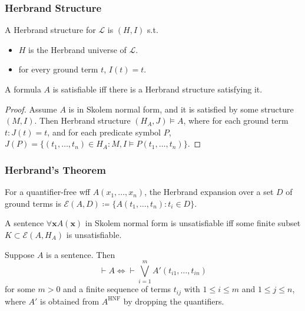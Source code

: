 \documentclass[UTF8,aspectratio=43,11pt,colorlinks,compress,openany]{beamer}%
\begin{document}
\begin{frame}\frametitle{Herbrand Structure}
\begin{definition}
A Herbrand structure for $\mathscr{L}$ is $(H,I)$ s.t.
\begin{itemize}
	\item $H$ is the Herbrand universe of $\mathscr{L}$.
	\item for every ground term $t$, $I(t)=t$.
\end{itemize}
\end{definition}
\begin{theorem}
A formula $A$ is satisfiable iff there is a Herbrand structure satisfying it.
\end{theorem}
\begin{proof}
Assume $A$ is in Skolem normal form, and it is satisfied by some structure $(M,I)$. Then Herbrand structure $(H_A,J)\vDash A$, where for each ground term $t: J(t)=t$, and for each predicate symbol $P$, $J(P)=\big\{(t_1,\dots,t_n)\in H_A: M,I\vDash P(t_1,\dots,t_n)\big\}$.
\end{proof}
\end{frame}

\begin{frame}\frametitle{Herbrand's Theorem}
For a quantifier-free wff $A(x_1,\dots,x_n)$, the Herbrand expansion over a set $D$ of ground terms is $\mathcal{E}(A,D)\coloneqq \big\{A(t_1,\dots,t_n): t_i\in D\big\}$.
\begin{theorem}
A sentence $\forall\mathbf{x} A(\mathbf{x})$ in Skolem normal form is unsatisfiable iff some finite subset $K\subset\mathcal{E}(A,H_A)$ is unsatisfiable.
\end{theorem}
	\begin{theorem}
		Suppose $A$ is a sentence. Then
		\[\vdash A\iff\vdash\bigvee\limits_{i=1}^m A'(t_{i1},\dots,t_{in})\]
		for some $m>0$ and a finite sequence of terms $t_{ij}$ with $1\leq i\leq m$ and $1\leq j\leq n$, where $A'$ is obtained from $A^{\mathrm{HNF}}$ by dropping the quantifiers.
	\end{theorem}
\end{frame}
\end{document}
